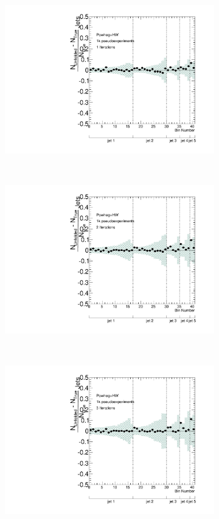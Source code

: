 \begin{figure}
\begin{subfigure}[]{0.5\textwidth}
\includegraphics[width=\textwidth]{fig/Stress/105860atlfast/FracBias1Iterations.pdf}
\end{subfigure}
~
\begin{subfigure}[]{0.5\textwidth}
\includegraphics[width=\textwidth]{fig/Stress/105860atlfast/FracBias2Iterations.pdf}
\end{subfigure}
\\
\begin{subfigure}[]{0.5\textwidth}
\includegraphics[width=\textwidth]{fig/Stress/105860atlfast/FracBias3Iterations.pdf}

\end{subfigure}
\end{figure}

